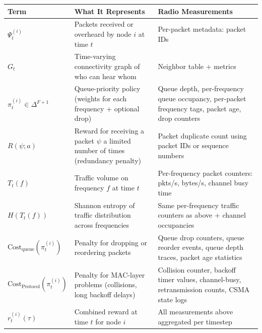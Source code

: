 \documentclass{article}
\begin{document}
\begin{tabular}{ |p{3cm}|p{5cm}|p{6cm}| }
\hline
\textbf{Term} & \textbf{What It Represents} & \textbf{Radio Measurements} \\
\hline

$\Psi_{t}^{(i)}$ 
& Packets received or overheard by node $i$ at time $t$
& Per-packet metadata: packet IDs \\

\hline

$G_{t}$ 
& Time-varying connectivity graph of who can hear whom
& Neighbor table + metrics \\

\hline

$\pi_{t}^{(i)} \in \Delta^{F+1}$ 
& Queue-priority policy (weights for each frequency + optional drop)
& Queue depth, per-frequency queue occupancy, per-packet frequency tags, packet age, drop counters \\

\hline

$R(\psi; a)$ 
& Reward for receiving a packet $\psi$ a limited number of times (redundancy penalty)
& Packet duplicate count using packet IDs or sequence numbers \\

\hline

$T_{t}(f)$ 
& Traffic volume on frequency $f$ at time $t$
& Per-frequency packet counters: pkts/s, bytes/s, channel busy time \\

\hline

$H(T_{t}(f))$ 
& Shannon entropy of traffic distribution across frequencies
& Same per-frequency traffic counters as above + channel occupancies \\

\hline

$\text{Cost}_{\text{queue}}(\pi_{t}^{(i)})$ 
& Penalty for dropping or reordering packets
& Queue drop counters, queue reorder events, queue depth traces, packet age statistics \\

\hline

$\text{Cost}_{\text{Protocol}}(\pi_{t}^{(i)})$ 
& Penalty for MAC-layer problems (collisions, long backoff delays)
& Collision counter, backoff timer values, channel-busy, retransmission counts, CSMA state logs \\

\hline

$r_{t}^{(i)}(\tau)$ 
& Combined reward at time $t$ for node $i$
& All measurements above aggregated per timestep \\

\hline
\end{tabular}
\newpage
\end{document}
